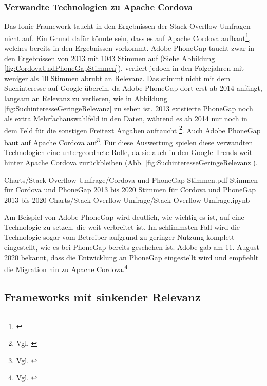 \subsubsection{Verwandte Technologien zu Apache Cordova} Das Ionic Framework taucht in den Ergebnissen der Stack Overflow Umfragen nicht auf.
Ein Grund dafür könnte sein, dass es auf Apache Cordova aufbaut\footnote{\cite{TheLastWordOnCordovaAndPhoneGap}}, welches bereits in den Ergebnissen vorkommt.
Adobe PhoneGap taucht zwar in den Ergebnissen von 2013 mit 1043 Stimmen auf (Siehe Abbildung \ref{fig:CordovaUndPhoneGapStimmen}), verliert jedoch in den Folgejahren mit weniger als 10 Stimmen abrubt an Relevanz.
Das stimmt nicht mit dem Suchinteresse auf Google überein, da Adobe PhoneGap dort erst ab 2014 anfängt, langsam an Relevanz zu verlieren, wie in Abbildung \ref{fig:SuchinteresseGeringeRelevanz} zu sehen ist. 2013 existierte PhoneGap noch als extra Mehrfachauswahlfeld in den Daten, während es ab 2014 nur noch in dem Feld für die sonstigen Freitext Angaben auftaucht \footnote{Vgl. \cite{StackOverflowInsights}}.
Auch Adobe PhoneGap baut auf Apache Cordova auf\footnote{Vgl.
\cite{FaqPhoneGapDocs}}.
Für diese Auswertung spielen diese verwandten Technologien eine untergeordnete Rolle, da sie auch in den Google Trends weit hinter Apache Cordova zurückbleiben (Abb.
\ref{fig:SuchinteresseGeringeRelevanz}).

\begin{alexfigurewithnotebook}{Charts/Stack Overflow Umfrage/Cordova und PhoneGap Stimmen.pdf}
	{Stimmen für Cordova und PhoneGap 2013 bis 2020}
	{Stimmen für Cordova und PhoneGap 2013 bis 2020}
	{Charts/Stack Overflow Umfrage/Stack Overflow Umfrage.ipynb}
	{}
	\label{fig:CordovaUndPhoneGapStimmen}

\end{alexfigurewithnotebook}

Am Beispiel von Adobe PhoneGap wird deutlich, wie wichtig es ist, auf eine Technologie zu setzen, die weit verbreitet ist.
Im schlimmsten Fall wird die Technologie sogar vom Betreiber aufgrund zu geringer Nutzung komplett eingestellt, wie es bei PhoneGap bereits geschehen ist.
Adobe gab am 11.
August 2020 bekannt, dass die  Entwicklung an PhoneGap eingestellt wird und empfiehlt die Migration hin zu Apache Cordova.\footnote{Vgl. \cite{UpdateForCustomersUsingPhoneGapAndPhoneGapBuild}}

\subsection{Frameworks mit sinkender Relevanz}


